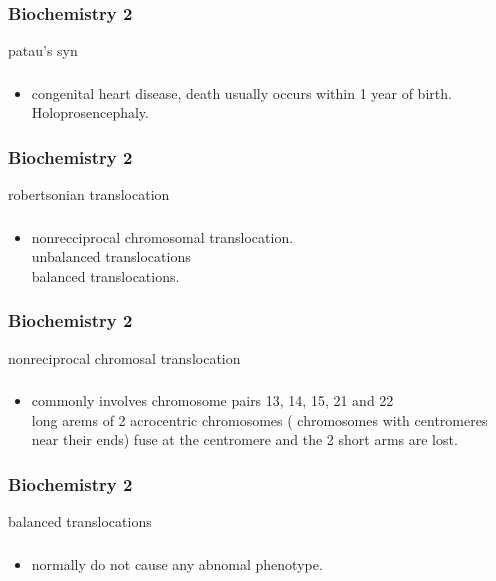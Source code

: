 \documentclass[11pt]{beamer}
\begin{document}
\begin{frame}
 \frametitle{Biochemistry 2}
patau's syn 
\end{frame}

\begin{frame}
 \frametitle{}
\begin{itemize}
\item congenital heart disease, death usually occurs within 1 year of birth. Holoprosencephaly. 
\end{itemize}
\end{frame}

\begin{frame}
 \frametitle{Biochemistry 2}
robertsonian translocation 
\end{frame}

\begin{frame}
 \frametitle{}
\begin{itemize}
\item nonrecciprocal chromosomal translocation.  \\ unbalanced translocations  \\ balanced translocations. 
\end{itemize}
\end{frame}

\begin{frame}
 \frametitle{Biochemistry 2}
nonreciprocal chromosal translocation 
\end{frame}

\begin{frame}
 \frametitle{}
\begin{itemize}
\item  commonly involves chromosome pairs 13, 14, 15, 21 and 22 \\ long arems of 2 acrocentric chromosomes ( chromosomes with centromeres near their ends) fuse at the centromere and the 2 short arms are lost. 
\end{itemize}
\end{frame}

\begin{frame}
 \frametitle{Biochemistry 2}
balanced translocations 
\end{frame}

\begin{frame}
 \frametitle{}
\begin{itemize}
\item normally do not cause any abnomal phenotype. 
\end{itemize}
\end{frame}
\end{document}

